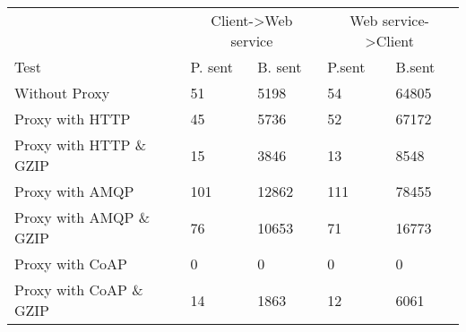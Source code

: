 \begin{tabularx}{\textwidth}{lXXXX}
\hline
\multicolumn{1}{l}{}                  & \multicolumn{2}{c}{Client->Web service}                           & \multicolumn{2}{c}{Web service->Client}                           \\
\multicolumn{1}{l}{Test} & \multicolumn{1}{l}{P. sent} & \multicolumn{1}{l}{B. sent} & \multicolumn{1}{l}{P.sent} & \multicolumn{1}{l}{B.sent} \\ \hline
Without Proxy                   & 51             & 5198           & 54             & 64805          \\
Proxy with HTTP                 & 45             & 5736           & 52             & 67172          \\
Proxy with HTTP \& GZIP         & 15             & 3846           & 13             & 8548           \\
Proxy with AMQP                 & 101            & 12862          & 111            & 78455          \\
Proxy with AMQP \& GZIP         & 76             & 10653          & 71             & 16773          \\
Proxy with CoAP                 & 0              & 0              & 0              & 0              \\
Proxy with CoAP \& GZIP         & 14             & 1863           & 12             & 6061           \\
\end{tabularx}
